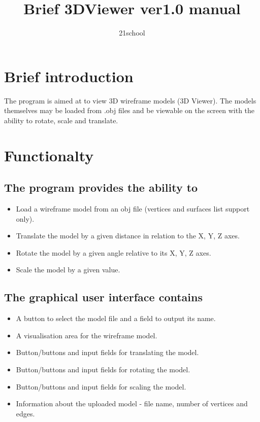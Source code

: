 \documentclass[12pt, a4paper]{article}
\title{Brief 3DViewer ver1.0 manual}
\author{21school}
\begin{document}
\maketitle

\pagebreak

\renewcommand\contentsname{}
\tableofcontents

\pagebreak

\section{Brief introduction}


The program is aimed at to view 3D wireframe models (3D Viewer). The models themselves may be loaded from .obj files and be viewable on the screen with the ability to rotate, scale and translate.

\pagebreak
\section{Functionalty}

\subsection{The program provides the ability to}

  \begin{itemize}
    \item Load a wireframe model from an obj file (vertices and surfaces list support only).
    \item Translate the model by a given distance in relation to the X, Y, Z axes.
    \item Rotate the model by a given angle relative to its X, Y, Z axes.
    \item Scale the model by a given value.
  \end{itemize}

  \subsection{The graphical user interface contains}

  \begin{itemize}
    \item A button to select the model file and a field to output its name.
    \item A visualisation area for the wireframe model.
    \item Button/buttons and input fields for translating the model.
    \item Button/buttons and input fields for rotating the model.
    \item Button/buttons and input fields for scaling the model.
    \item Information about the uploaded model - file name, number of vertices and edges.
  \end{itemize}
\end{document}
